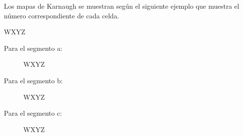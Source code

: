 
  Los mapas de Karnaugh se muestran según el siguiente ejemplo que muestra el
  número correspondiente de cada celda.
  \begin{center}
    \begin{Karnaugh}{W}{X}{Y}{Z}
    \end{Karnaugh}
  \end{center}

  Para el segmento a:
  \begin{figure}[H]
    \begin{center}
      \begin{Karnaugh}{W}{X}{Y}{Z}
      \end{Karnaugh}
    \end{center}
  \end{figure}

  Para el segmento b:
  \begin{figure}[H]
    \begin{center}
      \begin{Karnaugh}{W}{X}{Y}{Z}
      \end{Karnaugh}
    \end{center}
  \end{figure}

  Para el segmento c:
  \begin{figure}[H]
    \begin{center}
      \begin{Karnaugh}{W}{X}{Y}{Z}
      \end{Karnaugh}
    \end{center}
  \end{figure}

